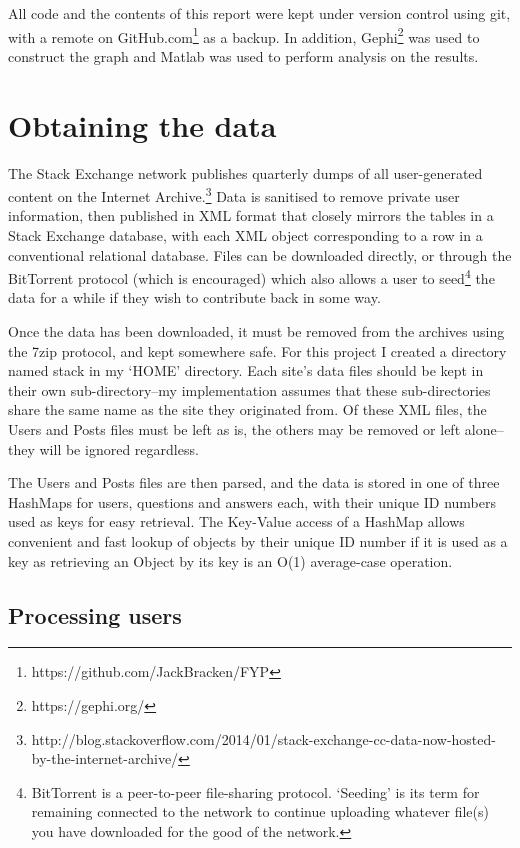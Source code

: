 \documentclass[]{final_report}
\begin{document}
All code and the contents of this report were kept under version control using git, with a remote on GitHub.com\footnote{https://github.com/JackBracken/FYP} as a backup. In addition, Gephi\footnote{https://gephi.org/} was used to construct the graph and Matlab was used to perform analysis on the results.

\section{Obtaining the data}

The Stack Exchange network publishes quarterly dumps of all user-generated content on the Internet Archive.\footnote{http://blog.stackoverflow.com/2014/01/stack-exchange-cc-data-now-hosted-by-the-internet-archive/} Data is sanitised to remove private user information, then published in XML format that closely mirrors the tables in a Stack Exchange database, with each XML object corresponding to a row in a conventional relational database. Files can be downloaded directly, or through the BitTorrent protocol (which is encouraged) which also allows a user to seed\footnote{BitTorrent is a peer-to-peer file-sharing protocol. `Seeding' is its term for remaining connected to the network to continue uploading whatever file(s) you have downloaded for the good of the network.} the data for a while if they wish to contribute back in some way.

Once the data has been downloaded, it must be removed from the archives using the 7zip protocol, and kept somewhere safe. For this project I created a directory named stack in my `HOME' directory. Each site's data files should be kept in their own sub-directory--my implementation assumes that these sub-directories share the same name as the site they originated from. Of these XML files, the Users and Posts files must be left as is, the others may be removed or left alone--they will be ignored regardless. 

The Users and Posts files are then parsed, and the data is stored in one of three HashMaps for users, questions and answers each, with their unique ID numbers used as keys for easy retrieval. The Key-Value access of a HashMap allows convenient and fast lookup of objects by their unique ID number if it is used as a key as retrieving an Object by its key is an O(1) average-case operation.

\subsection{Processing users}
\end{document}
